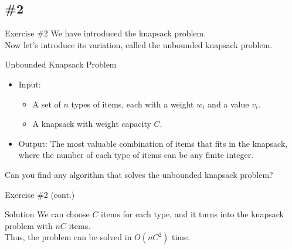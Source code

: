 \documentclass{beamer}
\begin{document}
\subsection{\#2}
\begin{frame}{Exercise \#2}
  We have introduced the knapsack problem. \pause \\[.5em]
  Now let's introduce its variation, called the unbounded knapsack problem.
  \pause
  \begin{block}{Unbounded Knapsack Problem}
    \begin{itemize}
      \item Input:
      \begin{itemize}
        \item A set of $n$ types of items, each with a weight $w_i$ and a value
        $v_i$.
        \item A knapsack with weight capacity $C$.
      \end{itemize}
      \item Output: The most valuable combination of items that fits in the
      knapsack, where the number of each type of items can be any finite
      integer.
    \end{itemize}
  \end{block}
  \pause
  Can you find any algorithm that solves the unbounded knapsack problem?
\end{frame}

\begin{frame}{Exercise \#2 (cont.)}
  \begin{block}{Solution}
    We can choose $C$ items for each type, and it turns into the
    knapsack problem with $nC$ items. \\
    Thus, the problem can be solved in $O(nC^2)$ time.
  \end{block}
\end{frame}
\end{document}

